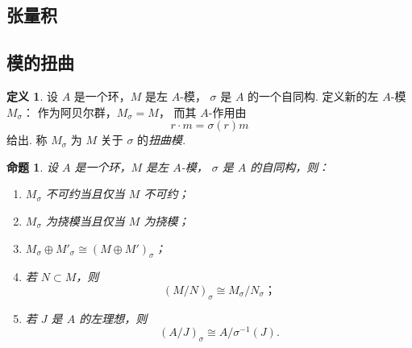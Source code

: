 \documentclass[11pt]{article}
\theoremstyle{plain}
\newtheorem{proposition}[theorem]{命题}
\theoremstyle{definition}
\newtheorem{definition}[theorem]{定义}
\theoremstyle{remark}
\begin{document}
\subsection{张量积}

\subsection{模的扭曲}

\begin{definition}
    设 $A$ 是一个环，$M$ 是左 $A$-模，
    $\sigma$ 是 $A$ 的一个自同构.
    定义新的左 $A$-模 $M_\sigma$：
    作为阿贝尔群，$M_\sigma=M$，
    而其 $A$-作用由
    \[
        r\cdot m=\sigma(r)m
    \]
    给出.
    称 $M_\sigma$ 为 $M$ 关于 $\sigma$ 的\emph{扭曲模}.
\end{definition}

\begin{proposition}
    设 $A$ 是一个环，$M$ 是左 $A$-模，
    $\sigma$ 是 $A$ 的自同构，则：
    \begin{enumerate}[label=(\arabic*)]
        \item $M_\sigma$ 不可约当且仅当 $M$ 不可约；
        \item $M_\sigma$ 为挠模当且仅当 $M$ 为挠模；
        \item $M_\sigma \oplus M'_\sigma \cong (M\oplus M')_\sigma$；
        \item 若 $N\subset M$，则
              \[
                  (M/N)_\sigma \cong M_\sigma/N_\sigma；
              \]
        \item 若 $J$ 是 $A$ 的左理想，则
              \[
                  (A/J)_\sigma \cong A/\sigma^{-1}(J).
              \]
    \end{enumerate}
\end{proposition}
\end{document}
